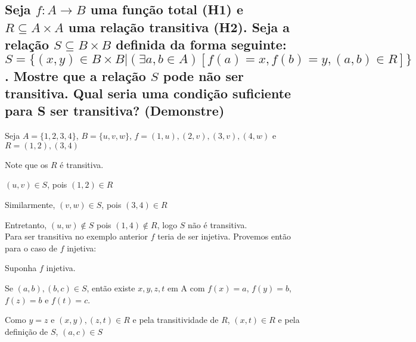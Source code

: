 \noindent
\subsection*{
	Seja 
	$ f \colon A \to B $ uma função total (H1) e $ R \subseteq A \times A $ uma relação transitiva (H2). Seja a relação $ S \subseteq B \times B $ definida da forma seguinte:	
	$ S = \{ (x,y) \in B \times B | (\exists a,b \in A)[f(a)=x, f(b)=y, (a,b) \in R ] \} $.
	Mostre que a relação $ S $ pode não ser transitiva.
	Qual seria uma condição suficiente para S ser transitiva? (Demonstre)
}


Seja $ A = \{ 1, 2, 3, 4 \} $, $ B = \{ u, v, w \} $, $ f = { (1,u), (2,v), (3,v), (4,w)} $ e $ R = {(1,2), (3,4)} $

Note que os $ R $ é transitiva.

$ (u,v) \in S $, pois $ (1,2) \in R $

Similarmente, $ (v,w) \in S $, pois $ (3,4) \in R $

Entretanto, $ (u,w) \notin S $ pois $(1,4) \notin R $, logo $ S $ não é transitiva.
\\
Para ser transitiva no exemplo anterior $ f $ teria de ser injetiva. Provemos então para o caso de $ f $ injetiva: 

Suponha $ f $ injetiva. 

Se $ (a,b), (b,c) \in S $, então existe $ x, y, z, t $ em A com $ f(x) = a $, $ f(y) = b $, $ f(z) = b $ e $ f(t) = c $. 

Como $ y = z $ e $ (x,y), (z,t) \in R $ e pela transitividade de $ R $, $ (x,t) \in R $ e pela definição de $ S $, $ (a,c) \in S $




